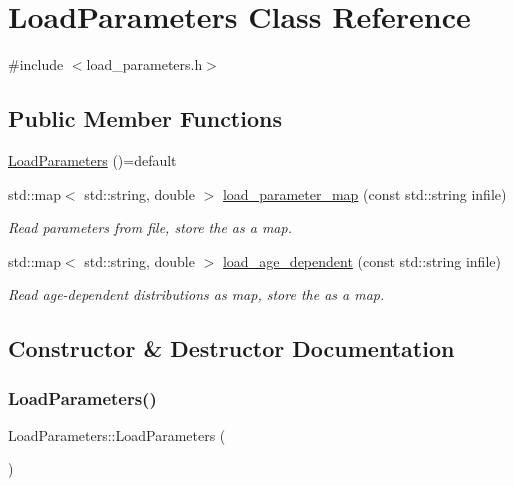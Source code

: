 \hypertarget{classLoadParameters}{}\section{Load\+Parameters Class Reference}
\label{classLoadParameters}


{\ttfamily \#include $<$load\+\_\+parameters.\+h$>$}

\subsection*{Public Member Functions}
\begin{DoxyCompactItemize}
\item 
\hyperlink{classLoadParameters_adf91d21ff44d619da32bb63b273f74c9}{Load\+Parameters} ()=default
\item 
std\+::map$<$ std\+::string, double $>$ \hyperlink{classLoadParameters_a1cdde96a8ca3874ef93e1c1a8970a06a}{load\+\_\+parameter\+\_\+map} (const std\+::string infile)
\begin{DoxyCompactList}\small\item\em Read parameters from file, store the as a map. \end{DoxyCompactList}\item 
std\+::map$<$ std\+::string, double $>$ \hyperlink{classLoadParameters_a682b13d074ff70340bbc782d31ccd10b}{load\+\_\+age\+\_\+dependent} (const std\+::string infile)
\begin{DoxyCompactList}\small\item\em Read age-\/dependent distributions as map, store the as a map. \end{DoxyCompactList}\end{DoxyCompactItemize}


\subsection{Constructor \& Destructor Documentation}
\mbox{\label{classLoadParameters_adf91d21ff44d619da32bb63b273f74c9}} 
\subsubsection{\texorpdfstring{Load\+Parameters()}{LoadParameters()}}
{\footnotesize\ttfamily Load\+Parameters\+::\+Load\+Parameters (\begin{DoxyParamCaption}{ }\end{DoxyParamCaption})\hspace{0.3cm}{\ttfamily [default]}}



